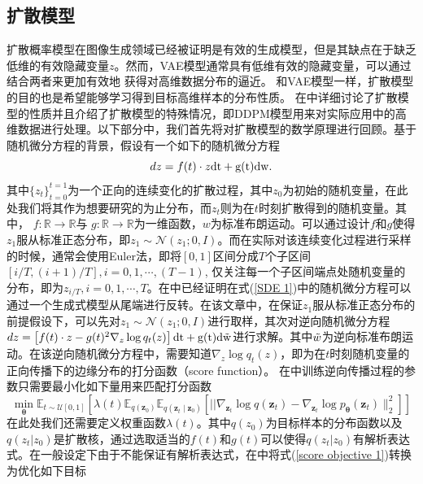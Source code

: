 \subsection{扩散模型}
扩散概率模型在图像生成领域已经被证明是有效的生成模型，但是其缺点在于缺乏低维的有效隐藏变量$z$。然而，VAE模型通常具有低维有效的隐藏变量，可以通过结合两者来更加有效地
获得对高维数据分布的逼近。
和VAE模型一样，扩散模型的目的也是希望能够学习得到目标高维样本的分布性质。 在\cite{diffusion}中详细讨论了扩散模型的性质并且介绍了扩散模型的特殊情况，即DDPM模型用来对实际应用中的高维数据进行处理。以下部分中，我们首先将对扩散模型的数学原理进行回顾。基于随机微分方程的背景，假设有一个如下的随机微分方程
\begin{equation}
    dz = f(t)\cdot z \rm{dt}+g(t)\rm{dw}.
    \label{SDE 1}
\end{equation}
其中$\{z_t\}_{t=0}^{t=1}$为一个正向的连续变化的扩散过程，其中$z_0$为初始的随机变量，在此处我们将其作为想要研究的为止分布，而$z_t$则为在$t$时刻扩散得到的随机变量。其中， $f: \mathbb{R}\rightarrow \mathbb{R}$与
 $g: \mathbb{R}\rightarrow \mathbb{R}$为一维函数，$w$为标准布朗运动。可以通过设计$f$和$g$使得$z_1$服从标准正态分布，即$z_1\sim \mathcal{N}(z_1;0,I)$。而在实际对该连续变化过程进行采样的时候，通常会使用Euler法，即将$[0,1]$区间分成$T$个子区间$[i/T,(i+1)/T], i =0,1,\cdots, (T-1)$, 仅关注每一个子区间端点处随机变量的分布，即为$z_{i/T},i=0,1,\cdots,T$。在\cite{diffusion}中已经证明在式(\ref{SDE 1})中的随机微分方程可以通过一个生成式模型从尾端进行反转。在该文章中，在保证$z_1$服从标准正态分布的前提假设下，可以先对$z_1\sim \mathcal{N}(z_1;0,I)$进行取样，其次对逆向随机微分方程 $dz = \left[f(t)\cdot z -g(t)^2 \nabla_z \log q_t(z)\right] \rm{dt} + g(t)d \Tilde{w}$进行求解。其中$\Tilde{w}$为逆向标准布朗运动。在该逆向随机微分方程中，需要知道$\nabla_z \log q_t(z)$，即为在$t$时刻随机变量的正向传播下的边缘分布的打分函数（score function）。
 在\cite{diffusion}中训练逆向传播过程的参数只需要最小化如下量用来匹配打分函数
\begin{equation}
    \min _{\boldsymbol{\theta}} \mathbb{E}_{t \sim \mathcal{U}[0,1]}\left[\lambda(t) \mathbb{E}_{q\left(\mathbf{z}_0\right)} \mathbb{E}_{q\left(\mathbf{z}_t \mid \mathbf{z}_0\right)}\left[|| \nabla_{\mathbf{z}_t} \log q\left(\mathbf{z}_t\right)-\nabla_{\mathbf{z}_t} \log p_{\boldsymbol{\theta}}\left(\mathbf{z}_t\right) \|_2^2\right]\right]
    \label{score objective 1}
\end{equation}
在此处我们还需要定义权重函数$\lambda(t)$。其中$q(z_0)$为目标样本的分布函数以及$q(z_t|z_0)$是扩散核，通过选取适当的$f(t)$和$g(t)$可以使得$q(z_t|z_0)$有解析表达式。在一般设定下由于不能保证有解析表达式，在\cite{diffusion}中将式(\ref{score objective 1})转换为优化如下目标
